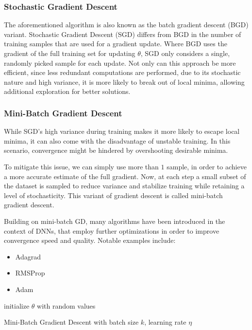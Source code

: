 \subsubsection{Stochastic Gradient Descent}
The aforementioned algorithm is also known as the batch gradient descent (BGD) variant. Stochastic Gradient Descent (SGD) differs from BGD in the number of training samples that are used for a gradient update. Where BGD uses the gradient of the full training set for updating $\theta$, SGD only considers a single, randomly picked sample for each update. Not only can this approach be more efficient, since less redundant computations are performed, due to its stochastic nature and high variance, it is more likely to break out of local minima, allowing additional exploration for better solutions. \cite{ruder2016overview}

\subsubsection{Mini-Batch Gradient Descent}
While SGD's high variance during training makes it more likely to escape local minima, it can also come with the disadvantage of unstable training. In this scenario, convergence might be hindered by overshooting desirable minima.

To mitigate this issue, we can simply use more than $1$ sample, in order to achieve a more accurate estimate of the full gradient. Now, at each step a small subset of the dataset is sampled to reduce variance and stabilize training while retaining a level of stochasticity. This variant of gradient descent is called mini-batch gradient descent.

Building on mini-batch GD, many algorithms have been introduced in the context of DNNs, that employ further optimizations in order to improve convergence speed and quality. Notable examples include:
\begin{itemize}
    \item Adagrad \cite{duchi2011adaptive}
    \item RMSProp \cite{hinton2012neural}
    \item Adam \cite{kingma2014adam}
\end{itemize}

\begin{algorithm}
    \SetAlgoLined
    initialize $\theta$ with random values \;
    \caption{Mini-Batch Gradient Descent with batch size $k$, learning rate $\eta$}
\end{algorithm}

